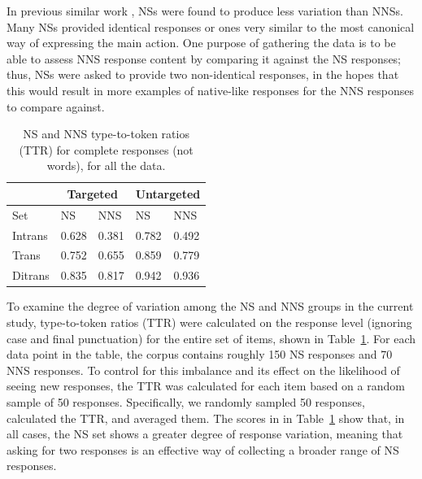 \documentclass[11pt,a4paper]{article}
\begin{document}
In previous similar work \citep{king:dickinson:13},
NSs were found to produce less variation than NNSs. Many NSs provided identical responses or ones very similar to the most canonical way of expressing the main action. One purpose of gathering the data is to be able to assess NNS response content by comparing it against the NS responses; thus, NSs were asked to provide two non-identical responses, in the hopes that this would result in more examples of native-like responses for the NNS responses to compare against.

\begin{table}[htb!]
\begin{center}
\begin{tabular}{|l||l|l||l|l|}
\hline
 & \multicolumn{2}{|c||}{Targeted} & \multicolumn{2}{|c|}{Untargeted} \\
\hline
 Set & NS & NNS & NS & NNS \\
\hline
\hline
Intrans & 0.628 & 0.381 & 0.782 & 0.492 \\
\hline
Trans & 0.752 & 0.655 & 0.859 & 0.779 \\ %
\hline
Ditrans & 0.835 & 0.817 & 0.942 & 0.936 \\ 
\hline
\end{tabular}
\caption{\label{tab:ttr} NS and NNS type-to-token ratios (TTR) for complete responses (not words), for all the data. }
\end{center}
\end{table}

To examine the degree of variation among the NS and NNS groups in the current study, type-to-token ratios (TTR) were calculated on the response level (ignoring case and final punctuation) for the entire set of items, shown in Table~\ref{tab:ttr}. For each data point in the table, the corpus contains roughly 150 NS responses and 70 NNS responses. To control for this imbalance and its effect on the likelihood of seeing new responses, the TTR was calculated for each item based on a random sample of 50 responses.  Specifically, we randomly sampled 50 responses, calculated the TTR, and averaged them. 
The scores in in Table~\ref{tab:ttr} show that, in all cases, the NS set shows a greater degree of response variation, meaning that asking for two responses is an effective way of collecting a broader range of NS responses.
\end{document}
